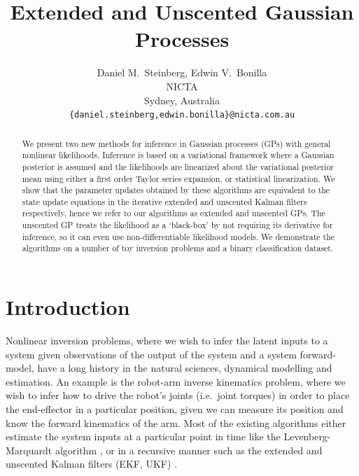 \documentclass{article} %
\title{Extended and Unscented Gaussian Processes}
\author{
    Daniel M.~Steinberg, Edwin V.~Bonilla \\
    NICTA \\
    Sydney, Australia\\
    \texttt{\{daniel.steinberg,edwin.bonilla\}@nicta.com.au}
}
\begin{document}
\maketitle

\begin{abstract}

    We present two new methods for inference in Gaussian processes (GPs) with
    general nonlinear likelihoods. Inference is based on a variational
    framework where a Gaussian posterior is assumed and the likelihoods are
    linearized about the variational posterior mean using either a first order
    Taylor series expansion, or statistical linearization. We show that the
    parameter updates obtained by these algorithms are equivalent to the state
    update equations in the iterative extended and unscented Kalman filters
    respectively, hence we refer to our algorithms as extended and unscented
    GPs. The unscented GP treats the likelihood as a `black-box' by not
    requiring its derivative for inference, so it can even use
    non-differentiable likelihood models. We demonstrate the algorithms on a
    number of toy inversion problems and a binary classification dataset.

\end{abstract}


\section{Introduction}

Nonlinear inversion problems, where we wish to infer the latent inputs to a
system given observations of the output of the system and a system
forward-model, have a long history in the natural sciences, dynamical modelling
and estimation. An example is the robot-arm inverse kinematics problem, where
we wish to infer how to drive the robot's joints (i.e.~joint torques) in order
to place the end-effector in a particular position, given we can measure its
position and know the forward kinematics of the arm. Most of the existing
algorithms either estimate the system inputs at a particular point in time like
the Levenberg-Marquardt algorithm \cite{Marquardt1963}, or in a recursive
manner such as the extended and unscented Kalman filters (EKF, UKF)
\cite{Julier2004}. 
\end{document}

